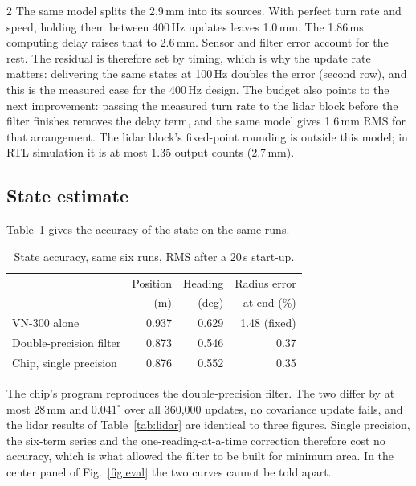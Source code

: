 \documentclass[10pt,letterpaper]{article}
\begin{document}
\begin{multicols}{2}
  The same model splits the 2.9\,mm into its sources.
  With perfect turn rate and speed, holding them between 400\,Hz updates leaves 1.0\,mm.
  The 1.86\,ms computing delay raises that to 2.6\,mm.
  Sensor and filter error account for the rest.
  The residual is therefore set by timing, which is why the update rate matters: delivering the same states at 100\,Hz doubles the error (second row), and this is the measured case for the 400\,Hz design.
  The budget also points to the next improvement: passing the measured turn rate to the lidar block before the filter finishes removes the delay term, and the same model gives 1.6\,mm RMS for that arrangement.
  The lidar block's fixed-point rounding is outside this model; in RTL simulation it is at most 1.35 output counts (2.7\,mm).

  \subsection{State estimate}
  \label{sec:num}

  Table~\ref{tab:acc} gives the accuracy of the state on the same runs.

  \begin{table}[H]
    \centering\footnotesize
    \caption{State accuracy, same six runs, RMS after a 20\,s start-up.}
    \label{tab:acc}
    \begin{tabular}{@{}lrrr@{}}
      \toprule
      & Position & Heading & Radius error\\
      & (m) & (deg) & at end (\%)\\
      \midrule
      VN-300 alone & 0.937 & 0.629 & 1.48 (fixed)\\
      Double-precision filter & 0.873 & 0.546 & 0.37\\
      Chip, single precision & 0.876 & 0.552 & 0.35\\
      \bottomrule
    \end{tabular}
  \end{table}

  The chip's program reproduces the double-precision filter.
  The two differ by at most 28\,mm and $0.041^\circ$ over all 360,000 updates, no covariance update fails, and the lidar results of Table~\ref{tab:lidar} are identical to three figures.
  Single precision, the six-term series and the one-reading-at-a-time correction therefore cost no accuracy, which is what allowed the filter to be built for minimum area.
  In the center panel of Fig.~\ref{fig:eval} the two curves cannot be told apart.


\end{multicols}
\end{document}
